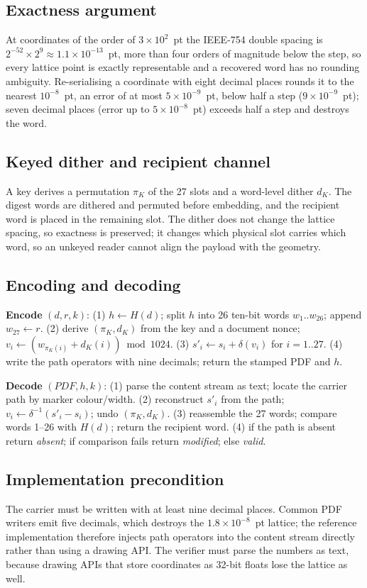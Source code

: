 \documentclass[journal]{IEEEtran}
\begin{document}
\subsection{Exactness argument}
At coordinates of the order of $3\times10^{2}$~pt the IEEE-754 double spacing is $2^{-52}\times2^{9}\approx1.1\times10^{-13}$~pt, more than four orders of magnitude below the step, so every lattice point is exactly representable and a recovered word has no rounding ambiguity. Re-serialising a coordinate with eight decimal places rounds it to the nearest $10^{-8}$~pt, an error of at most $5\times10^{-9}$~pt, below half a step ($9\times10^{-9}$~pt); seven decimal places (error up to $5\times10^{-8}$~pt) exceeds half a step and destroys the word.

\subsection{Keyed dither and recipient channel}
A key derives a permutation $\pi_K$ of the 27 slots and a word-level dither $d_K$. The digest words are dithered and permuted before embedding, and the recipient word is placed in the remaining slot. The dither does not change the lattice spacing, so exactness is preserved; it changes which physical slot carries which word, so an unkeyed reader cannot align the payload with the geometry.

\subsection{Encoding and decoding}
\textbf{Encode} $(d,r,k)$: (1) $h\leftarrow H(d)$; split $h$ into 26 ten-bit words $w_1..w_{26}$; append $w_{27}\leftarrow r$. (2) derive $(\pi_K,d_K)$ from the key and a document nonce; $v_i\leftarrow(w_{\pi_K(i)}+d_K(i))\bmod 1024$. (3) $s'_i\leftarrow s_i+\delta(v_i)$ for $i=1..27$. (4) write the path operators with nine decimals; return the stamped PDF and $h$.

\textbf{Decode} $(PDF,h,k)$: (1) parse the content stream as text; locate the carrier path by marker colour/width. (2) reconstruct $s'_i$ from the path; $v_i\leftarrow\delta^{-1}(s'_i-s_i)$; undo $(\pi_K,d_K)$. (3) reassemble the 27 words; compare words 1--26 with $H(d)$; return the recipient word. (4) if the path is absent return \emph{absent}; if comparison fails return \emph{modified}; else \emph{valid}.

\subsection{Implementation precondition}
The carrier must be written with at least nine decimal places. Common PDF writers emit five decimals, which destroys the $1.8\times10^{-8}$~pt lattice; the reference implementation therefore injects path operators into the content stream directly rather than using a drawing API. The verifier must parse the numbers as text, because drawing APIs that store coordinates as 32-bit floats lose the lattice as well.
\end{document}
